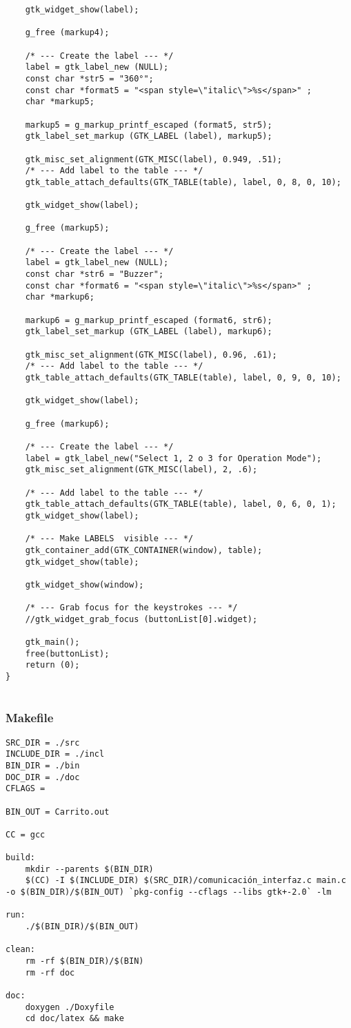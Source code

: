 \begin{lstlisting}
	gtk_widget_show(label);

	g_free (markup4);

	/* --- Create the label --- */
	label = gtk_label_new (NULL);
	const char *str5 = "360°";
	const char *format5 = "<span style=\"italic\">%s</span>" ;
	char *markup5;

	markup5 = g_markup_printf_escaped (format5, str5);
	gtk_label_set_markup (GTK_LABEL (label), markup5);

	gtk_misc_set_alignment(GTK_MISC(label), 0.949, .51);
	/* --- Add label to the table --- */
	gtk_table_attach_defaults(GTK_TABLE(table), label, 0, 8, 0, 10);

	gtk_widget_show(label);

	g_free (markup5);

	/* --- Create the label --- */
	label = gtk_label_new (NULL);
	const char *str6 = "Buzzer";
	const char *format6 = "<span style=\"italic\">%s</span>" ;
	char *markup6;

	markup6 = g_markup_printf_escaped (format6, str6);
	gtk_label_set_markup (GTK_LABEL (label), markup6);

	gtk_misc_set_alignment(GTK_MISC(label), 0.96, .61);
	/* --- Add label to the table --- */
	gtk_table_attach_defaults(GTK_TABLE(table), label, 0, 9, 0, 10);

	gtk_widget_show(label);

	g_free (markup6);

	/* --- Create the label --- */
	label = gtk_label_new("Select 1, 2 o 3 for Operation Mode");
	gtk_misc_set_alignment(GTK_MISC(label), 2, .6);

	/* --- Add label to the table --- */
	gtk_table_attach_defaults(GTK_TABLE(table), label, 0, 6, 0, 1);
	gtk_widget_show(label);

	/* --- Make LABELS  visible --- */
	gtk_container_add(GTK_CONTAINER(window), table);
	gtk_widget_show(table);

	gtk_widget_show(window);

	/* --- Grab focus for the keystrokes --- */
	//gtk_widget_grab_focus (buttonList[0].widget);

	gtk_main();
	free(buttonList);
	return (0);
}


\end{lstlisting}
\subsubsection{Makefile}

\begin{lstlisting}
SRC_DIR = ./src
INCLUDE_DIR = ./incl
BIN_DIR = ./bin
DOC_DIR = ./doc
CFLAGS =

BIN_OUT = Carrito.out

CC = gcc

build:
	mkdir --parents $(BIN_DIR)
	$(CC) -I $(INCLUDE_DIR) $(SRC_DIR)/comunicación_interfaz.c main.c  -o $(BIN_DIR)/$(BIN_OUT) `pkg-config --cflags --libs gtk+-2.0` -lm

run:
	./$(BIN_DIR)/$(BIN_OUT)

clean:
	rm -rf $(BIN_DIR)/$(BIN)
	rm -rf doc

doc:
	doxygen ./Doxyfile
	cd doc/latex && make


\end{lstlisting}